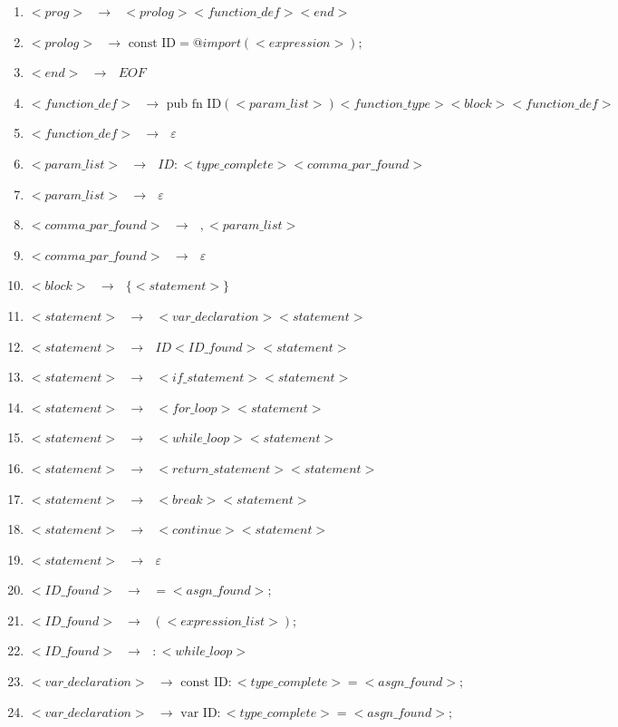 \documentclass[12pt]{article}
\begin{document}
\begin{enumerate}
\item $<prog>\text{ }\to \text{ }<prolog> <function\_def> <end>$
\item $<prolog> \text{ }\to \text{ const ID} = @import ( <expression> ) ;$
\item $<end> \text{ }\to \text{ } EOF$
\item $<function\_def> \text{ }\to \text{ pub fn ID}  (<param\_list>) <function\_type> <block> <function\_def>$
\item $<function\_def> \text{ }\to \text{ } \varepsilon$
\item $<param\_list> \text{ }\to \text{ } ID : <type\_complete> <comma\_par\_found>$
\item $<param\_list> \text{ }\to \text{ } \varepsilon$
\item $<comma\_par\_found> \text{ }\to \text{ } , <param\_list>$
\item $<comma\_par\_found> \text{ }\to \text{ } \varepsilon$
\item $<block> \text{ }\to \text{ } \{ <statement> \}$
\item $<statement> \text{ }\to \text{ } <var\_declaration> <statement>$
\item $<statement> \text{ }\to \text{ } ID <ID\_found> <statement>$
\item $<statement> \text{ }\to \text{ } <if\_statement> <statement>$
\item $<statement> \text{ }\to \text{ } <for\_loop> <statement>$
\item $<statement> \text{ }\to \text{ } <while\_loop> <statement> $
\item $<statement> \text{ }\to \text{ } <return\_statement> <statement>$
\item $<statement> \text{ }\to \text{ } <break> <statement>$
\item $<statement> \text{ }\to \text{ } <continue> <statement>$
\item $<statement> \text{ }\to \text{ } \varepsilon$
\item $<ID\_found> \text{ }\to \text{ } = <asgn\_found> ;$
\item $<ID\_found> \text{ }\to \text{ } ( <expression\_list> );$
\item $<ID\_found> \text{ }\to \text{ } : <while\_loop>$
\item $<var\_declaration> \text{ }\to \text{ const ID} : <type\_complete> = <asgn\_found> ;$
\item $<var\_declaration> \text{ }\to \text{ var ID} : <type\_complete> = <asgn\_found> ;$

\end{enumerate}
\end{document}

